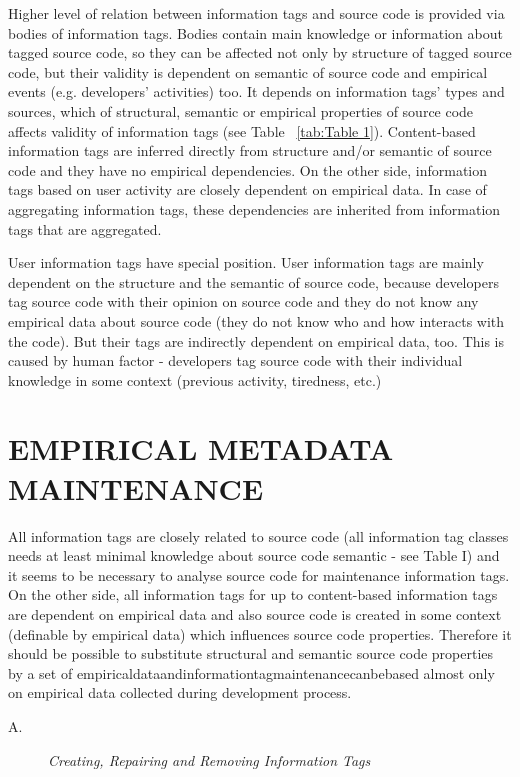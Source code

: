 \documentclass[18px,a4, conference]{IEEEtran}
\begin{document}
 Higher level of relation between information tags and source code is provided via bodies of information tags.
Bodies contain main knowledge or information about tagged source code, so they can be affected not only by structure of tagged source code, but their validity is dependent on semantic of source code and empirical events (e.g. developers’ activities) too. It depends on information tags’ types and sources, which of structural, semantic or empirical properties of source code affects validity of information tags (see Table ~\ref{tab:Table 1}). Content-based information tags are inferred directly from structure and/or semantic of source code and they have no empirical dependencies. On the other side, information tags based on user activity are closely dependent on empirical data. In case of aggregating information tags, these dependencies are inherited from information tags that are aggregated.

 User information tags have special position. User information tags are mainly dependent on the structure and the semantic of source code, because developers tag source code with their opinion on source code and they do not know any empirical data about source code (they do not know who and how interacts with the code). But their tags are indirectly dependent on empirical data, too. This is caused by human factor - developers tag source code with their individual knowledge in some context (previous activity, tiredness, etc.) 
\section{EMPIRICAL METADATA MAINTENANCE}
\label{sec:EMPIRICAL METADATA MAINTENANCE}
All information tags are closely related to source code (all information tag classes needs at least minimal knowledge about source code semantic - see Table I) and it seems to be necessary to analyse source code for maintenance information tags. On the other side, all information tags for up to content-based information tags are dependent on empirical data and also source code is created in some context (deﬁnable by empirical data) which inﬂuences source code properties. Therefore it should be possible to substitute structural and semantic source code properties by a set of empiricaldataandinformationtagmaintenancecanbebased almost only on empirical data collected during development process.				
\begin{description}
\item [A.] \textit{Creating, Repairing and Removing Information Tags} 
\end{description}
\end{document}
